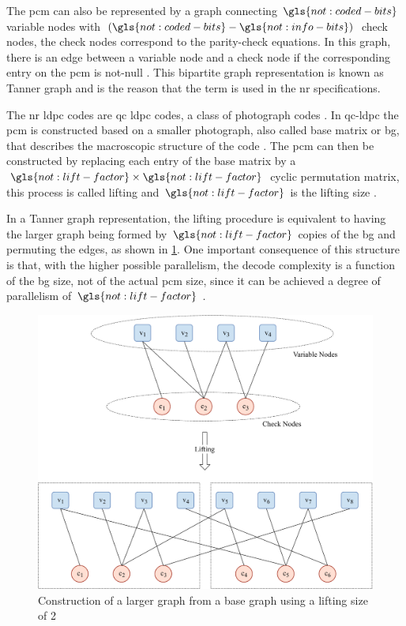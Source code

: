 The \gls{pcm} can also be represented by a graph connecting $\gls{not:coded-bits}$ variable nodes with $(\gls{not:coded-bits}-\gls{not:info-bits})$ check nodes, the check nodes correspond to the parity-check equations.
%
In this graph, there is an edge between a variable node and a check node if the corresponding entry on the \gls{pcm} is not-null \cite{Richardson2018}.
%
This bipartite graph representation is known as Tanner graph \cite{TannerGraph} and is the reason that the term  is used in the \gls{nr} specifications.
%


The \gls{nr} \gls{ldpc} codes are \gls{qc} \gls{ldpc} codes, a class of photograph codes \cite{bae_abotabl_lin_song_lee_2019}.
%
In \gls{qc}-\gls{ldpc} the \gls{pcm} is constructed based on a smaller photograph, also called base matrix or \gls{bg}, that describes the macroscopic structure of the code \cite{Richardson2018}.
%
The \gls{pcm} can then be constructed by replacing each entry of the base matrix by a $\gls{not:lift-factor} \times \gls{not:lift-factor} $ cyclic permutation matrix, this process is called lifting and $\gls{not:lift-factor}$ is the lifting size \cite{AliZaidi632018}.


In a Tanner graph representation, the lifting procedure is equivalent to having the larger graph being formed by $\gls{not:lift-factor}$ copies of the \gls{bg} and permuting the edges, as shown in \ref{fig:graph-lifting}.
%
One important consequence of this structure is that, with the higher possible parallelism, the decode complexity is a function of the \gls{bg} size, not of the actual \gls{pcm} size, since it can be achieved a degree of parallelism of $\gls{not:lift-factor}$ \cite{bae_abotabl_lin_song_lee_2019}.

\begin{figure}[htbp]
\includegraphics[width=\columnwidth]{figures/chp_theory/tanner_graph.pdf}
\caption{Construction of a larger graph from a base graph using a lifting size of 2}
\label{fig:graph-lifting}
\end{figure}


